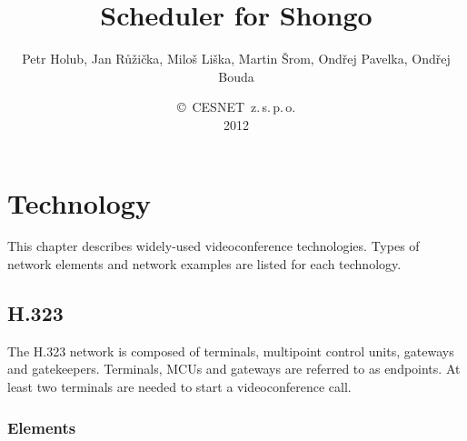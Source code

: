 \documentclass[a4paper]{report}
\begin{document}
\title{Scheduler for Shongo}
\author{Petr Holub, Jan Růžička, Miloš Liška, Martin Šrom, Ondřej Pavelka, Ondřej Bouda}
\date{\copyright~CESNET~z.\,s.\,p.\,o.\\2012}
\maketitle
\tableofcontents


\chapter{Technology}

This chapter describes widely-used videoconference technologies. Types of network elements and network examples are listed for each technology.


\section{H.323}

The H.323 network is composed of terminals, multipoint control units, gateways and gatekeepers. Terminals, MCUs and gateways are referred to as endpoints. At least two terminals are needed to start a videoconference call.

\subsection{Elements}
\end{document}

